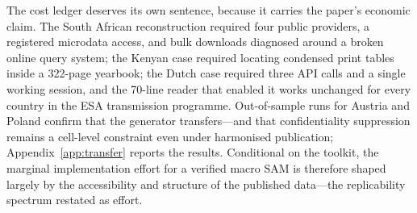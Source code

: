The cost ledger deserves its own sentence, because it carries the paper's
economic claim. The South African reconstruction required four public
providers, a registered microdata access, and bulk downloads diagnosed
around a broken online query system; the Kenyan case required locating
condensed print tables inside a 322-page yearbook; the Dutch case required
three API calls and a single working session, and the 70-line reader that
enabled it works unchanged for every country in the ESA transmission
programme. Out-of-sample runs for Austria and Poland confirm that the
generator transfers---and that confidentiality suppression remains a
cell-level constraint even under harmonised publication;
Appendix~\ref{app:transfer} reports the results. Conditional on the
toolkit, the marginal implementation effort for a verified macro SAM is
therefore shaped largely by the accessibility and structure of the
published data---the replicability spectrum restated as effort.
